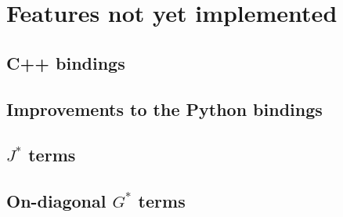 \chapter{Features not yet implemented}
\begin{synopsis}
\end{synopsis}
\minitoc
\vspace{\fill}
\newpage

\section{C++ bindings}
\section{Improvements to the Python bindings}
\section{$J^*$ terms}
\section{On-diagonal $G^*$ terms}

